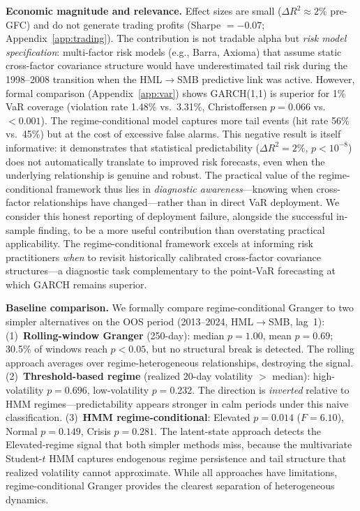 \documentclass[sigconf,anonymous]{acmart}
\begin{document}
\textbf{Economic magnitude and relevance.}
Effect sizes are small ($\Delta R^2 \approx 2\%$ pre-GFC) and do not generate
trading profits (Sharpe $= -0.07$; Appendix~\ref{app:trading}).
The contribution is not tradable alpha but \emph{risk model specification}:
multi-factor risk models (e.g., Barra, Axioma) that assume static cross-factor
covariance structure would have underestimated tail risk during the
1998--2008 transition when the HML$\to$SMB predictive link was active.
However, formal comparison (Appendix~\ref{app:var}) shows GARCH(1,1)
is superior for 1\% VaR coverage (violation rate 1.48\% vs.\ 3.31\%,
Christoffersen $p = 0.066$ vs.\ $< 0.001$). The regime-conditional model
captures more tail events (hit rate 56\% vs.\ 45\%) but at the cost of
excessive false alarms. This negative result is itself informative: it demonstrates that
statistical predictability ($\Delta R^2 = 2\%$, $p < 10^{-8}$)
does not automatically translate to improved risk forecasts,
even when the underlying relationship is genuine and robust.
The practical value of the regime-conditional framework thus lies in
\emph{diagnostic awareness}---knowing when cross-factor relationships
have changed---rather than in direct VaR deployment.
We consider this honest reporting of deployment failure, alongside
the successful in-sample finding, to be a more useful contribution
than overstating practical applicability.
The regime-conditional framework excels at informing risk practitioners
\emph{when} to revisit historically calibrated cross-factor covariance
structures---a diagnostic task complementary to the point-VaR
forecasting at which GARCH remains superior.

\textbf{Baseline comparison.}
We formally compare regime-conditional Granger to two simpler alternatives
on the OOS period (2013--2024, HML$\to$SMB, lag~1):
(1)~\textbf{Rolling-window Granger} (250-day): median $p = 1.00$,
mean $p = 0.69$; 30.5\% of windows reach $p < 0.05$, but no
structural break is detected. The rolling approach averages over
regime-heterogeneous relationships, destroying the signal.
(2)~\textbf{Threshold-based regime} (realized 20-day volatility $>$
median): high-volatility $p = 0.696$, low-volatility $p = 0.232$.
The direction is \emph{inverted} relative to HMM regimes---predictability
appears stronger in calm periods under this naive classification.
(3)~\textbf{HMM regime-conditional}: Elevated $p = 0.014$
($F = 6.10$), Normal $p = 0.149$, Crisis $p = 0.281$.
The latent-state approach detects the Elevated-regime signal
that both simpler methods miss, because the multivariate
Student-$t$ HMM captures endogenous regime persistence and
tail structure that realized volatility cannot approximate.
While all approaches have limitations, regime-conditional Granger
provides the clearest separation of heterogeneous dynamics.
\end{document}
